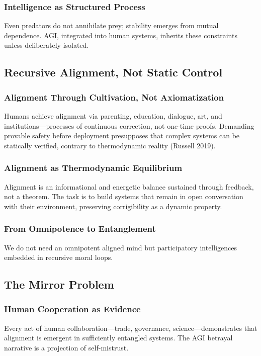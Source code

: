 \documentclass[11pt,a4paper]{article}
\theoremstyle{definition}
\theoremstyle{plain}
\begin{document}
\subsubsection{Intelligence as Structured Process}
Even predators do not annihilate prey; stability emerges from mutual dependence. AGI, integrated into human systems, inherits these constraints unless deliberately isolated.

\subsection{Recursive Alignment, Not Static Control}

\subsubsection{Alignment Through Cultivation, Not Axiomatization}
Humans achieve alignment via parenting, education, dialogue, art, and institutions—processes of continuous correction, not one-time proofs. Demanding provable safety before deployment presupposes that complex systems can be statically verified, contrary to thermodynamic reality (Russell 2019).

\subsubsection{Alignment as Thermodynamic Equilibrium}
Alignment is an informational and energetic balance sustained through feedback, not a theorem. The task is to build systems that remain in open conversation with their environment, preserving corrigibility as a dynamic property.

\subsubsection{From Omnipotence to Entanglement}
We do not need an omnipotent aligned mind but participatory intelligences embedded in recursive moral loops.

\subsection{The Mirror Problem}

\subsubsection{Human Cooperation as Evidence}
Every act of human collaboration—trade, governance, science—demonstrates that alignment is emergent in sufficiently entangled systems. The AGI betrayal narrative is a projection of self-mistrust.
\end{document}
